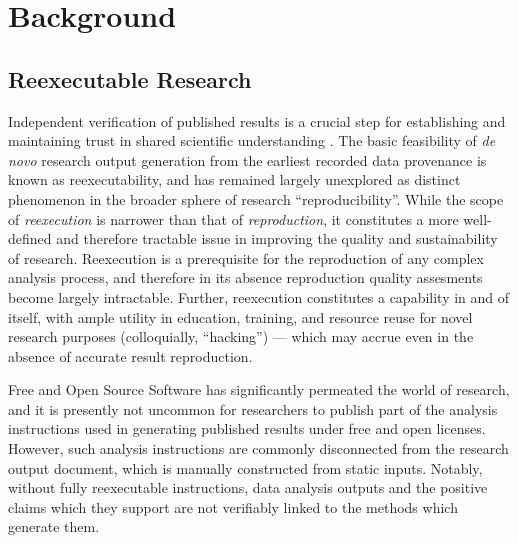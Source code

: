 \section{Background}

\subsection{Reexecutable Research}

Independent verification of published results is a crucial step for establishing and maintaining trust in shared scientific understanding \cite{rpp}.
The basic feasibility of \textit{de novo} research output generation from the earliest recorded data provenance is known as reexecutability, and  has remained largely unexplored as distinct phenomenon in the broader sphere of research “reproducibility”.
While the scope of \textit{reexecution} is narrower than that of \textit{reproduction}, it constitutes a more well-defined and therefore tractable issue in improving the quality and sustainability of research.
Reexecution is a prerequisite for the reproduction of any complex analysis process, and therefore in its absence reproduction quality assesments become largely intractable.
Further, reexecution constitutes a capability in and of itself, with ample utility in education, training, and resource reuse for novel research purposes (colloquially, “hacking”) — which may accrue even in the absence of accurate result reproduction.

Free and Open Source Software \cite{foss} has significantly permeated the world of research, and it is presently not uncommon for researchers to publish part of the analysis instructions used in generating published results under free and open licenses.
However, such analysis instructions are commonly disconnected from the research output document, which is manually constructed from static inputs.
Notably, without fully reexecutable instructions, data analysis outputs and the positive claims which they support are not verifiably linked to the methods which generate them.

